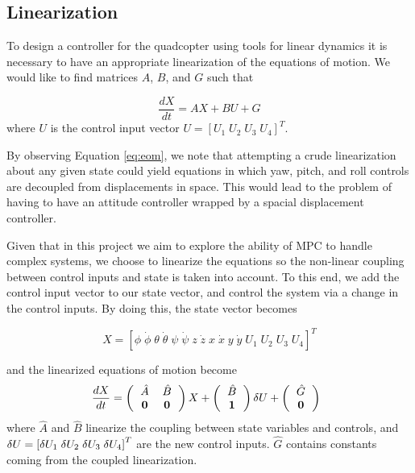
\subsection{Linearization}
To design a controller for the quadcopter using tools for linear dynamics it is necessary to have an appropriate linearization of the equations of motion. We would like to find matrices $A$, $B$, and $G$ such that

\begin{equation}
\frac{d X}{d t} = A X + B U + G
\end{equation}
where $U$ is the control input vector $U = \left[U_1\; U_2\; U_3\; U_4\right]^T$. 

 By observing Equation \eqref{eq:eom}, we note that attempting a crude linearization about any given state could yield equations in which yaw, pitch, and roll controls are decoupled from displacements in space. This would lead to the problem of having to have an attitude controller wrapped by a spacial displacement controller. 
 
 Given that in this project we aim to explore the ability of MPC to handle complex systems, we choose to linearize the equations so the non-linear coupling between control inputs and state is taken into account. To this end, we add the control input vector to our state vector, and control the system via a change in the control inputs. By doing this, the state vector becomes
 
 \begin{equation}
 X = \left[\phi \; \dot{\phi} \; \theta \; \dot{\theta} \; \psi \; \dot{\psi} \; z \; \dot{z} \; x \; \dot{x} \; y \; \dot{y}\; U_1\; U_2\; U_3\; U_4
 \right]^T
 \end{equation}
 
 and the linearized equations of motion become
\begin{equation} \label{eq:lin_eom}
\frac{d X}{d t} = \left(
\begin{tabular}{c c c c c c c c c c c c}
$\hat{A}$ & $\hat{B}$ \\
${\bf 0}$ & ${\bf 0}$
\end{tabular}
\right)X +  
\left(
\begin{tabular}{c c c c c c c c c c c c}
$\hat{B}$ \\
${\bf 1}$
\end{tabular}
\right)\delta U + 
\left(
\begin{tabular}{c}
$\hat{G}$\\
${\bf 0}$
\end{tabular}\right)\;\; 
\end{equation}
where $\hat{A}$ and $\hat{B}$ linearize the coupling between state variables and controls, and $\delta U = \left[ \delta U_1 \;\delta U_2 \;\delta U_3 \;\delta U_4 \right]^T$ are the new control inputs. $\hat{G}$ contains constants coming from the coupled linearization.

